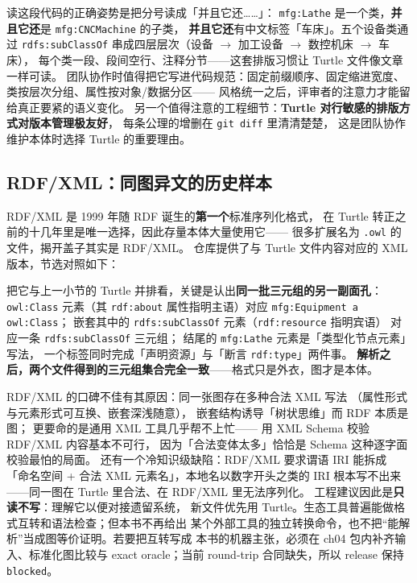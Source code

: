 

读这段代码的正确姿势是把分号读成「并且它还……」：
\texttt{mfg:Lathe} 是一个类，\textbf{并且它还}是 \texttt{mfg:CNCMachine} 的子类，
\textbf{并且它还}有中文标签「车床」。五个设备类通过 \texttt{rdfs:subClassOf}
串成四层层次（设备 \(\rightarrow\) 加工设备 \(\rightarrow\) 数控机床 \(\rightarrow\) 车床），
每个类一段、段间空行、注释分节——这套排版习惯让 Turtle 文件像文章一样可读。
团队协作时值得把它写进代码规范：固定前缀顺序、固定缩进宽度、
类按层次分组、属性按对象/数据分区——
风格统一之后，评审者的注意力才能留给真正要紧的语义变化。
另一个值得注意的工程细节：\textbf{Turtle 对行敏感的排版方式对版本管理极友好}，
每条公理的增删在 \texttt{git diff} 里清清楚楚，
这是团队协作维护本体时选择 Turtle 的重要理由。

\subsection{RDF/XML：同图异文的历史样本}

RDF/XML 是 1999 年随 RDF 诞生的\textbf{第一个}标准序列化格式，
在 Turtle 转正之前的十几年里是唯一选择，因此存量本体大量使用它——
很多扩展名为 \texttt{.owl} 的文件，揭开盖子其实是 RDF/XML。
仓库提供了与 Turtle 文件内容对应的 XML 版本，节选对照如下：



把它与上一小节的 Turtle 并排看，关键是认出\textbf{同一批三元组的另一副面孔}：
\texttt{owl:Class} 元素（其 \texttt{rdf:about} 属性指明主语）对应
\texttt{mfg:Equipment a owl:Class}；
嵌套其中的 \texttt{rdfs:subClassOf} 元素（\texttt{rdf:resource} 指明宾语）
对应一条 \texttt{rdfs:subClassOf} 三元组；
结尾的 \texttt{mfg:Lathe} 元素是「类型化节点元素」写法，
一个标签同时完成「声明资源」与「断言 \texttt{rdf:type}」两件事。
\textbf{解析之后，两个文件得到的三元组集合完全一致}——格式只是外衣，图才是本体。

RDF/XML 的口碑不佳有其原因：同一张图存在多种合法 XML 写法
（属性形式与元素形式可互换、嵌套深浅随意），
嵌套结构诱导「树状思维」而 RDF 本质是图；
更要命的是通用 XML 工具几乎帮不上忙——
用 XML Schema 校验 RDF/XML 内容基本不可行，
因为「合法变体太多」恰恰是 Schema 这种逐字面校验最怕的局面。
还有一个冷知识级缺陷：RDF/XML 要求谓语 IRI 能拆成
「命名空间 + 合法 XML 元素名」，本地名以数字开头之类的 IRI
根本写不出来——同一图在 Turtle 里合法、在 RDF/XML 里无法序列化。
工程建议因此是\textbf{只读不写}：理解它以便对接遗留系统，
新文件优先用 Turtle。生态工具普遍能做格式互转和语法检查；但本书不再给出
某个外部工具的独立转换命令，也不把“能解析”当成图等价证明。若要把互转写成
本书的机器主张，必须在 ch04 包内补齐输入、标准化图比较与 exact oracle；当前
round-trip 合同缺失，所以 release 保持 \texttt{blocked}。

